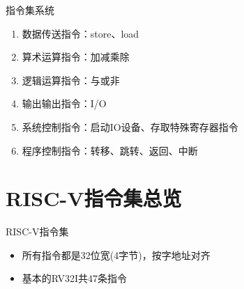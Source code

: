 \documentclass{myslide}
\begin{document}
\begin{frame}{指令集系统}
\begin{enumerate}
	\item 数据传送指令：store、load
	\item 算术运算指令：加减乘除
	\item 逻辑运算指令：与或非
	\item 输出输出指令：I/O
	\item 系统控制指令：启动IO设备、存取特殊寄存器指令
	\item 程序控制指令：转移、跳转、返回、中断
\end{enumerate}
\end{frame}


\section{RISC-V指令集总览}
\begin{frame}
\sectionpage
\end{frame}

\begin{frame}{RISC-V指令集}
\begin{itemize}
	\item 所有指令都是32位宽(4字节)，按字地址对齐
	\item 基本的RV32I共47条指令
\end{itemize}
\end{frame}
\end{document}
